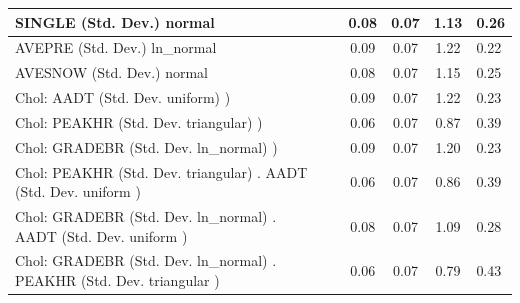 \begin{table}
\begin{center}
\begin{tabular}{|l|l|c|c|c|l|}
			\hline
			SINGLE (Std. Dev.) normal &  & 0.08 & 0.07 & 1.13 & 0.26 \\
			\hline
			AVEPRE (Std. Dev.) ln_normal &  & 0.09 & 0.07 & 1.22 & 0.22 \\
			\hline
			AVESNOW (Std. Dev.) normal &  & 0.08 & 0.07 & 1.15 & 0.25 \\
			\hline
			 Chol: AADT (Std. Dev. uniform) ) &  & 0.09 & 0.07 & 1.22 & 0.23 \\
			\hline
			 Chol: PEAKHR (Std. Dev. triangular) ) &  & 0.06 & 0.07 & 0.87 & 0.39 \\
			\hline
			 Chol: GRADEBR (Std. Dev. ln_normal) ) &  & 0.09 & 0.07 & 1.20 & 0.23 \\
			\hline
			 Chol: PEAKHR (Std. Dev. triangular) . AADT (Std. Dev.   uniform ) &  & 0.06 & 0.07 & 0.86 & 0.39 \\
			\hline
			 Chol: GRADEBR (Std. Dev. ln_normal) . AADT (Std. Dev.   uniform ) &  & 0.08 & 0.07 & 1.09 & 0.28 \\
			\hline
			 Chol: GRADEBR (Std. Dev. ln_normal) . PEAKHR (Std. Dev.   triangular ) &  & 0.06 & 0.07 & 0.79 & 0.43 \\
			\hline
		\end{tabular}
	\end{center}
\end{table}